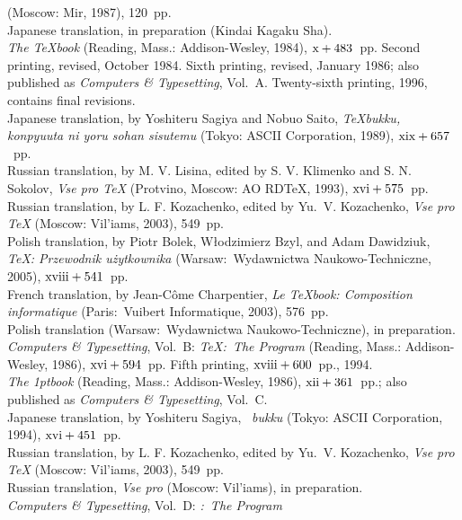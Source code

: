  (Moscow: Mir, 1987), 120~pp.
\\Japanese translation, in preparation (Kindai Kagaku Sha).
\yyskip
\\{\sl The \TeX book\/} (Reading, Mass.: Addison-Wesley, 1984), $\rm x+483$~pp.
 Second printing, revised, October 1984. Sixth printing, revised,
 January 1986; also published as {\sl Computers \& Typesetting}, Vol.~A.
 Twenty-sixth printing, 1996, contains final revisions.
\\Japanese translation, by Yoshiteru Sagiya and Nobuo Saito,
 {\sl \TeX bukku, konpyuuta ni yoru sohan sisutemu\/}
 (Tokyo: ASCII Corporation, 1989), $\rm xix+657$~pp.
\\Russian translation, by M. V. Lisina, edited by S. V. Klimenko and
 S. N. Sokolov, {\sl Vse pro \TeX\/}
 (Protvino, Moscow: AO RD\TeX, 1993), $\rm xvi+575$~pp.
\\Russian translation, by L. F. Kozachenko, edited by Yu.~V. Kozachenko,
 {\sl Vse pro \TeX\/} (Moscow: Vil'iams, 2003), 549~pp.
\\Polish translation, by Piotr Bolek, W{\l}odzimierz Bzyl, and Adam Dawidziuk,
 {\sl \TeX: Przewodnik u\.zytkownika\/} (Warsaw:\ Wydawnictwa
 Naukowo-Techniczne, 2005), $\rm xviii+541$~pp.
\\French translation, by Jean-C\^ome Charpentier, {\sl Le \TeX book:
 Composition informatique\/} (Paris:\ Vuibert Informatique, 2003), 576~pp.
\\Polish translation (Warsaw:\ Wydawnictwa
 Naukowo-Techniczne), in preparation.
\yyskip
\\{\sl Computers \& Typesetting}, Vol.~B: {\sl \TeX:\ The Program\/}
 (Reading, Mass.: Addison-Wesley, 1986), $\rm xvi + 594$~pp.
 Fifth printing, $\rm xviii + 600$~pp., 1994.
\yyskip
\\{\sl The \slMF\kern1ptbook\/} (Reading, Mass.: Addison-Wesley, 1986),
 $\rm xii+361$~pp.; also published as {\sl Computers \& Typesetting}, Vol.~C.
\\Japanese translation, by Yoshiteru Sagiya, {\slMF\ \sl bukku}
 (Tokyo: ASCII Corporation, 1994), $\rm xvi+451$~pp.
\\Russian translation, by L. F. Kozachenko, edited by Yu.~V. Kozachenko,
 {\sl Vse pro \TeX\/} (Moscow: Vil'iams, 2003), 549~pp.
\\Russian translation, {\sl Vse pro \slMF\/} (Moscow: Vil'iams),
 in preparation.
\yyskip
\\{\sl Computers \& Typesetting}, Vol.~D: {\sl \slMF:\ The Program\/}
